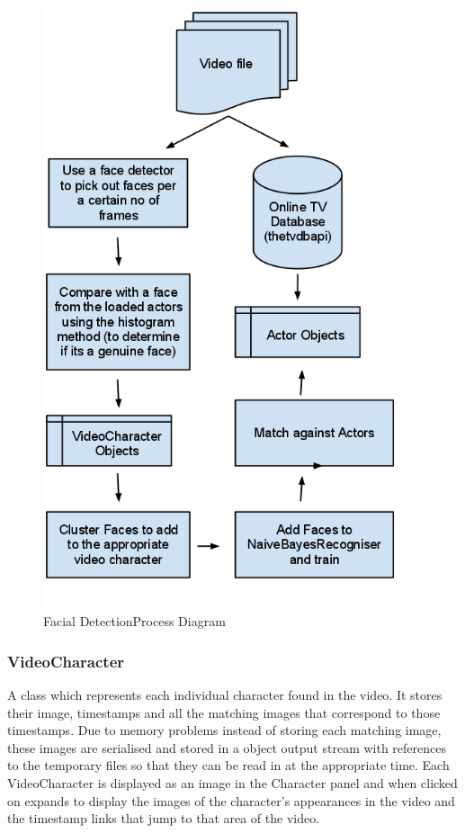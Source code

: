 \begin{figure}[h1]
\begin{center}
 \includegraphics[trim = 0mm 0mm 0mm 0mm, clip,
 scale=0.5]{Images/FacialRecognitionProcess.png}
  \caption{Facial DetectionProcess Diagram}
 \label{fig:DrWhoFD}
 \end{center}
\end{figure}

\subsubsection{VideoCharacter}
A class which represents each individual character found in the video. It stores their image, timestamps and all the matching images that 
correspond to those timestamps. Due to memory problems instead of storing each matching image, these images are serialised and stored in a 
object output stream with references to the temporary files so that they can be read in at the appropriate time. Each VideoCharacter is displayed as an 
image in the Character panel and when clicked on expands to display the images of the character's appearances in the video and the timestamp links that jump to that area of the video. 

